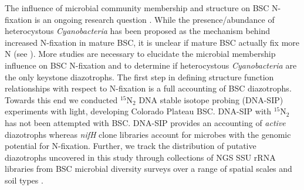 The influence of microbial community membership and structure on BSC N-fixation
is an ongoing research question \citep{Belnap28062013}. While the
presence/abundance of heterocystous \textit{Cyanobacteria} has been proposed as
the mechanism behind increased N-fixation in mature BSC, it is unclear if
mature BSC actually fix more N (see \citet{15643930}). More studies are
necessary to elucidate the microbial membership influence on BSC N-fixation and
to determine if heterocystous \textit{Cyanobacteria} are the only keystone
diazotrophs. The first step in defining structure function relationships with
respect to N-fixation is a full accounting of BSC diazotrophs. Towards this end
we conducted $^{15}$N$_{2}$ DNA stable isotope probing (DNA-SIP) experiments
with light, developing Colorado Plateau BSC. DNA-SIP with $^{15}$N$_{2}$ has not
been attempted with BSC. DNA-SIP provides an accounting of 
\textit{active} diazotrophs whereas \textit{nifH} clone libraries account for 
microbes with the genomic potential for N-fixation. Further, we track the
distribution of putative diazotrophs uncovered in this study through
collections of NGS SSU rRNA libraries from BSC microbial diversity surveys over
a range of spatial scales and soil types \citep{Garcia_Pichel_2013,
Steven_2013}. 
